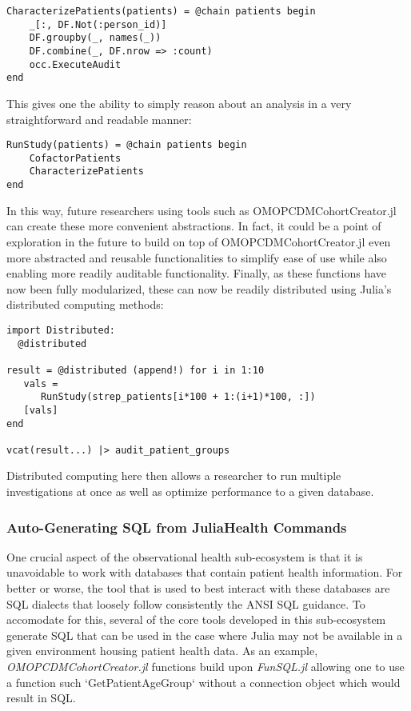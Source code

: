 \documentclass{juliacon}
\begin{document}
\begin{verbatim}
CharacterizePatients(patients) = @chain patients begin
    _[:, DF.Not(:person_id)]
    DF.groupby(_, names(_))
    DF.combine(_, DF.nrow => :count)
    occ.ExecuteAudit
end
\end{verbatim}

This gives one the ability to simply reason about an analysis in a very straightforward and readable manner:

\begin{verbatim}
RunStudy(patients) = @chain patients begin
    CofactorPatients
    CharacterizePatients
end
\end{verbatim}

In this way, future researchers using tools such as OMOPCDMCohortCreator.jl can create these more convenient abstractions.
In fact, it could be a point of exploration in the future to build on top of OMOPCDMCohortCreator.jl even more abstracted and reusable functionalities to simplify ease of use while also enabling more readily auditable functionality.
Finally, as these functions have now been fully modularized, these can now be readily distributed using Julia's distributed computing methods:

\begin{verbatim}
import Distributed:
  @distributed 

result = @distributed (append!) for i in 1:10
   vals = 
      RunStudy(strep_patients[i*100 + 1:(i+1)*100, :])
   [vals]
end

vcat(result...) |> audit_patient_groups
\end{verbatim}

Distributed computing here then allows a researcher to run multiple investigations at once as well as optimize performance to a given database.


\subsubsection{Auto-Generating SQL from JuliaHealth Commands}

One crucial aspect of the observational health sub-ecosystem is that it is unavoidable to work with databases that contain patient health information.
For better or worse, the tool that is used to best interact with these databases are SQL dialects that loosely follow consistently the ANSI SQL guidance.
To accomodate for this, several of the core tools developed in this sub-ecosystem generate SQL that can be used in the case where Julia may not be available in a given environment housing patient health data.
As an example, \textit{OMOPCDMCohortCreator.jl} functions build upon \textit{FunSQL.jl} allowing one to use a function such `GetPatientAgeGroup` without a connection object which would result in SQL.
\end{document}
